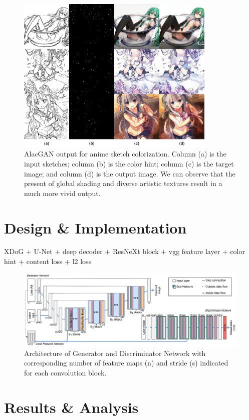 \begin{figure}
    \centering
    \includegraphics[width=0.85\textwidth]{images/colorization/alacgan.jpg}
    \caption{AlacGAN output for anime sketch colorization. Column (a) is the input sketches; column (b) is the color hint; column (c) is the target image; and column (d) is the output image. We can observe that the present of global shading and diverse artistic textures result in a much more vivid output.} 
    \label{fig:colorization_alacgan}
\end{figure}

\section{Design \& Implementation}
XDoG + U-Net + deep decoder + ResNeXt block + vgg feature layer + color hint + content loss + l2 loss


\begin{figure}
    \centering
    \includegraphics[width=1.0\textwidth]{images/colorization/alacgan_arch.png}
    \caption{Architecture of Generator and Discriminator Network with corresponding number of feature maps (n) and stride (s) indicated for each convolution block.} 
    \label{fig:alacgan_arch}
\end{figure}

\section{Results \& Analysis}

